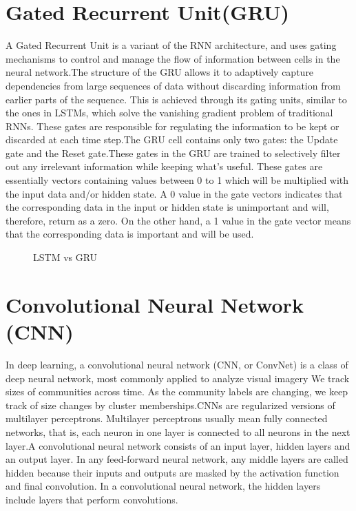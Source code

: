 \section{ Gated Recurrent Unit(GRU)}
A Gated Recurrent Unit is a variant of the RNN architecture, and uses gating mechanisms to control and manage the flow of information between cells in the neural network.The structure of the GRU allows it to adaptively capture dependencies from large sequences of data without discarding information from earlier parts of the sequence. This is achieved through its gating units, similar to the ones in LSTMs, which solve the vanishing gradient problem of traditional RNNs. These gates are responsible for regulating the information to be kept or discarded at each time step.The GRU cell contains only two gates: the Update gate and the Reset gate.These gates in the GRU are trained to selectively filter out any irrelevant information while keeping what’s useful. These gates are essentially vectors containing values between 0 to 1 which will be multiplied with the input data and/or hidden state.
A 0 value in the gate vectors indicates that the corresponding data in the input or hidden state is unimportant and will, therefore, return as a zero. On the other hand, a 1 value in the gate vector means that the corresponding data is important and will be used.
\begin{figure}
%
  \caption{LSTM vs GRU}
  \label{fig:key}
\end{figure}
\section{ Convolutional Neural Network (CNN)}
In deep learning, a convolutional neural network (CNN, or ConvNet) is a class of deep neural network, most commonly applied to analyze visual imagery
We track sizes of communities across time.
As the community labels are changing, we keep track of size changes by cluster memberships.CNNs are regularized versions of multilayer perceptrons. Multilayer perceptrons usually mean fully connected networks, that is, each neuron in one layer is connected to all neurons in the next layer.A convolutional neural network consists of an input layer, hidden layers and an output layer. In any feed-forward neural network, any middle layers are called hidden because their inputs and outputs are masked by the activation function and final convolution. In a convolutional neural network, the hidden layers include layers that perform convolutions. \cite{cnn}

